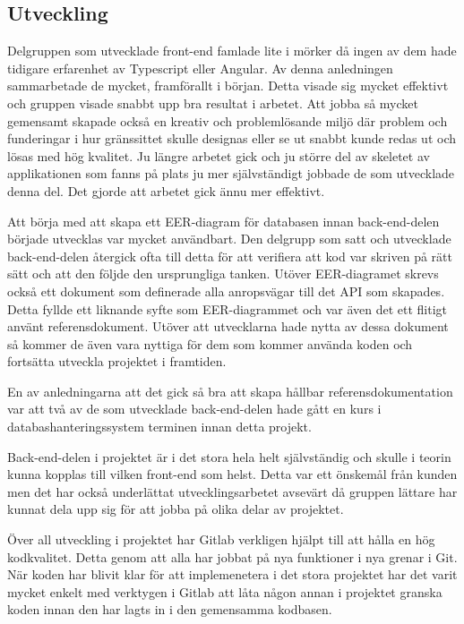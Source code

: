 \subsection{Utveckling}
Delgruppen som utvecklade front-end famlade lite i mörker då ingen av dem hade tidigare erfarenhet av Typescript eller Angular. Av denna anledningen sammarbetade de mycket, framförallt i början. Detta visade sig mycket effektivt och gruppen visade snabbt upp bra resultat i arbetet. Att jobba så mycket gemensamt skapade också en kreativ och problemlösande miljö där problem och funderingar i hur gränssittet skulle designas eller se ut snabbt kunde redas ut och lösas med hög kvalitet. Ju längre arbetet gick och ju större del av skeletet av applikationen som fanns på plats ju mer självständigt jobbade de som utvecklade denna del. Det gjorde att arbetet gick ännu mer effektivt.

Att börja med att skapa ett EER-diagram för databasen innan back-end-delen började utvecklas var mycket användbart. Den delgrupp som satt och utvecklade back-end-delen återgick ofta till detta för att verifiera att kod var skriven på rätt sätt och att den följde den ursprungliga tanken. Utöver EER-diagramet skrevs också ett dokument som definerade alla anropsvägar till det API som skapades. Detta fyllde ett liknande syfte som EER-diagrammet och var även det ett flitigt använt referensdokument. Utöver att utvecklarna hade nytta av dessa dokument så kommer de även vara nyttiga för dem som kommer använda koden och fortsätta utveckla projektet i framtiden.

En av anledningarna att det gick så bra att skapa hållbar referensdokumentation var att två av de som utvecklade back-end-delen hade gått en kurs i databashanteringssystem terminen innan detta projekt.

Back-end-delen i projektet är i det stora hela helt självständig och skulle i teorin kunna kopplas till vilken front-end som helst. Detta var ett önskemål från kunden men det har också underlättat utvecklingsarbetet avsevärt då gruppen lättare har kunnat dela upp sig för att jobba på olika delar av projektet.

Över all utveckling i projektet har Gitlab verkligen hjälpt till att hålla en hög kodkvalitet. Detta genom att alla har jobbat på nya funktioner i nya grenar i Git. När koden har blivit klar för att implemenetera i det stora projektet har det varit mycket enkelt med verktygen i Gitlab att låta någon annan i projektet granska koden innan den har lagts in i den gemensamma kodbasen.

